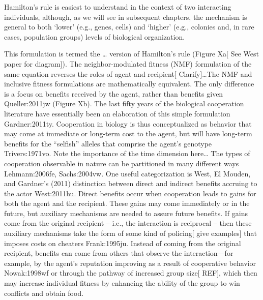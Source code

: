 \documentclass{tufte-book} %
\begin{document}
Hamilton’s rule is easiest to understand in the context of two interacting individuals, although, as we will see in subsequent chapters, the mechanism is general to both ‘lower’ (e.g., genes, cells) and ‘higher’ (e.g., colonies and, in rare cases, population groups) levels of biological organization.

This formulation is termed the … version of Hamilton’s rule (Figure Xa[ See West paper for diagram]). The neighbor-modulated fitness (NMF) formulation of the same equation reverses the roles of agent and recipient[ Clarify]…The NMF and inclusive fitness formulations are mathematically equivalent. The only difference is a focus on benefits received by the agent, rather than benefits given {Queller:2011jw} (Figure Xb).
	The last fifty years of the biological cooperation literature have essentially been an elaboration of this simple formulation {Gardner:2011ty}. Cooperation in biology is thus conceptualized as behavior that may come at immediate or long-term cost to the agent, but will have long-term benefits for the “selfish” alleles that comprise the agent’s genotype {Trivers:1971vo}. Note the importance of the time dimension here…
The types of cooperation observable in nature can be partitioned in many different ways {Lehmann:2006fe, Sachs:2004vw}. One useful categorization is West, El Mouden, and Gardner’s (2011) distinction between direct and indirect benefits accruing to the actor {West:2011hu}.
 Direct benefits occur when cooperation leads to gains for both the agent and the recipient. These gains may come immediately or in the future, but auxiliary mechanisms are needed to assure future benefits. If gains come from the original recipient – i.e., the interaction is reciprocal – then these auxiliary mechanisms take the form of some kind of policing[ give examples] that imposes costs on cheaters {Frank:1995ju}. Instead of coming from the original recipient, benefits can come from others that observe the interaction—for example, by the agent’s reputation improving as a result of cooperative behavior {Nowak:1998wf} or through the pathway of increased group size[ REF], which then may increase individual fitness by enhancing the ability of the group to win conflicts and obtain food. 
\end{document}
